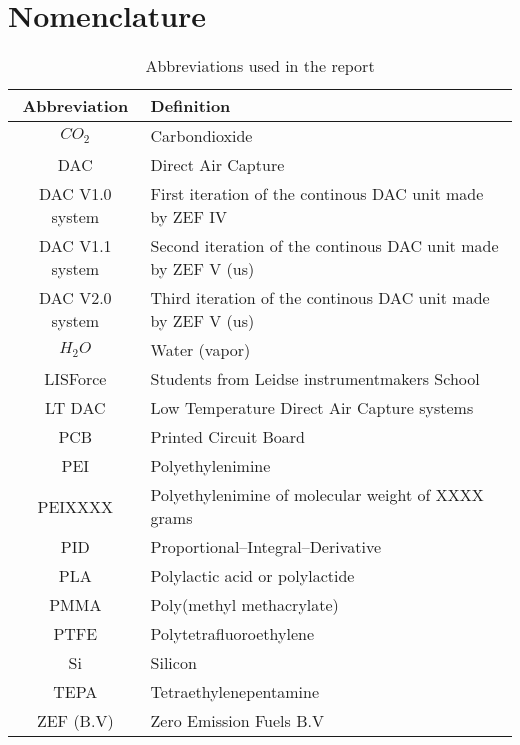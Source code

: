 \section{Nomenclature}

\begin{table}[H]
    \centering
    \begin{tabular}{c|l}
        Abbreviation & Definition  \\
        \hline 
        \hline
         $CO_2$ & Carbondioxide\\
    DAC  & Direct Air Capture\\
    DAC V1.0 system & First iteration of the continous DAC unit made by ZEF IV\\
    DAC V1.1 system  & Second iteration of the continous DAC unit made by ZEF V (us)\\
    DAC V2.0 system  & Third iteration of the continous DAC unit made by ZEF V (us)\\
    $H_{2}O$ & Water (vapor)\\
    LISForce & Students from Leidse instrumentmakers School\\
    LT DAC & Low Temperature Direct Air Capture systems\\
    PCB  & Printed Circuit Board\\
    PEI  & Polyethylenimine\\
    PEIXXXX & Polyethylenimine of molecular weight of XXXX grams\\
    PID & Proportional–Integral–Derivative\\
    PLA  & Polylactic acid or polylactide\\
    PMMA  & Poly(methyl methacrylate)\\
    PTFE & Polytetrafluoroethylene \\
    Si & Silicon \\
    TEPA  & Tetraethylenepentamine\\
    ZEF (B.V) & Zero Emission Fuels B.V  \\
 
    \end{tabular}
    \caption{Abbreviations used in the report}
    \label{tab:nom}
\end{table}